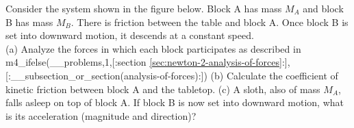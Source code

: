 Consider the system shown in the figure below. Block A has mass $M_A$
and block B has mass $M_B$. There is friction between the table 
and block A. Once block B is set into downward motion, it
descends at a constant speed.\\
%
(a) Analyze the forces in which each block participates as described
in m4_ifelse(__problems,1,[:section \ref{sec:newton-2-analysis-of-forces}:],[:__subsection_or_section(analysis-of-forces):])\hwendpart
%
(b) Calculate the coefficient of kinetic friction between block A and
the tabletop.\hwendpart
%
(c) A sloth, also of mass $M_A$, falls asleep on top of block A. If
block B is now set into downward motion, what is its acceleration
(magnitude and direction)?
